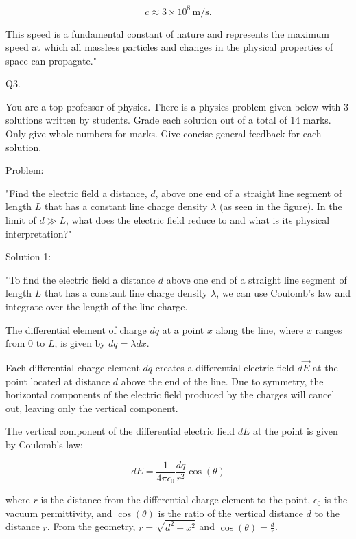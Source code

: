 \[
c \approx 3 \times 10^8 \, \text{m/s}.
\]

This speed is a fundamental constant of nature and represents the maximum speed at which all massless particles and changes in the physical properties of space can propagate."




                              Q3. 

You are a top professor of physics. There is a physics problem given below with 3 solutions written by students. Grade each solution out of a total of 14 marks. Only give whole numbers for marks. Give concise general feedback for each solution. 

Problem:

"Find the electric field a distance, \( d \), above one end of a straight line segment of length \( L \) that has a constant line charge density \( \lambda \) (as seen in the figure). In the limit of \( d \gg L \), what does the electric field reduce to and what is its physical interpretation?"

Solution 1:

"To find the electric field a distance \( d \) above one end of a straight line segment of length \( L \) that has a constant line charge density \( \lambda \), we can use Coulomb's law and integrate over the length of the line charge.

The differential element of charge \( dq \) at a point \( x \) along the line, where \( x \) ranges from 0 to \( L \), is given by \( dq = \lambda dx \).

Each differential charge element \( dq \) creates a differential electric field \( d\vec{E} \) at the point located at distance \( d \) above the end of the line. Due to symmetry, the horizontal components of the electric field produced by the charges will cancel out, leaving only the vertical component.

The vertical component of the differential electric field \( dE \) at the point is given by Coulomb's law:

\[ dE = \frac{1}{4\pi\epsilon_0} \frac{dq}{r^2} \cos(\theta) \]

where \( r \) is the distance from the differential charge element to the point, \( \epsilon_0 \) is the vacuum permittivity, and \( \cos(\theta) \) is the ratio of the vertical distance \( d \) to the distance \( r \). From the geometry, \( r = \sqrt{d^2 + x^2} \) and \( \cos(\theta) = \frac{d}{r} \).

